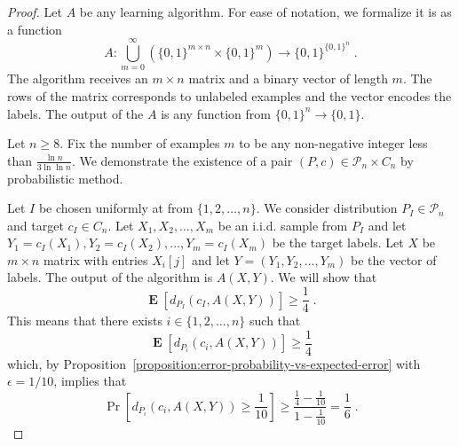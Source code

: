 \documentclass[10pt]{article}
\renewcommand{\P}{\mathcal{P}}
\DeclareMathOperator{\Exp}{\mathbf{E}}
\begin{document}
\begin{proof}
Let $A$ be any learning algorithm. For ease of notation, we formalize it is as a function
$$
A:\bigcup_{m=0}^\infty \left(\{0,1\}^{m \times n} \times \{0,1\}^m\right) \to \{0,1\}^{\{0,1\}^n} \; .
$$
The algorithm receives an $m \times n$ matrix and a binary vector of length $m$.
The rows of the matrix corresponds to unlabeled examples and the vector encodes
the labels. The output of the $A$ is any function from $\{0,1\}^n \to \{0,1\}$.

Let $n \ge 8$. Fix the number of examples $m$ to be any non-negative integer less than
$\frac{\ln n}{3 \ln \ln n}$. We demonstrate the existence of a pair $(P,c) \in
\P_n \times C_n$ by probabilistic method.

Let $I$ be chosen uniformly at from $\{1,2,\dots,n\}$. We consider distribution $P_I \in \P_n$ and target $c_I \in C_n$.
Let $X_1, X_2, \dots, X_m$ be an i.i.d. sample from $P_I$ and
let $Y_1 = c_I(X_1), Y_2 = c_I(X_2), \dots, Y_m = c_I(X_m)$ be the target
labels. Let $X$ be $m \times n$ matrix with entries $X_i[j]$ and let $Y = (Y_1,
Y_2, \dots, Y_m)$ be the vector of labels. The output of the algorithm is $A(X,Y)$.
We will show that
\begin{equation}
\label{equation:failure-probability}
\Exp \left[d_{P_I}(c_I, A(X,Y)) \right] \ge \frac{1}{4} \; .
\end{equation}
This means that there exists $i \in \{1,2,\dots,n\}$ such that
$$
\Exp \left[d_{P_i}(c_i, A(X,Y)) \right] \ge \frac{1}{4}
$$
which, by Proposition~\ref{proposition:error-probability-vs-expected-error} with $\epsilon=1/10$, implies that
$$
\Pr \left[ d_{P_i}(c_i, A(X,Y)) \ge \frac{1}{10} \right] \ge \frac{\frac{1}{4} - \frac{1}{10}}{1 - \frac{1}{10}} = \frac{1}{6} \; .
$$


\end{proof}
\end{document}
